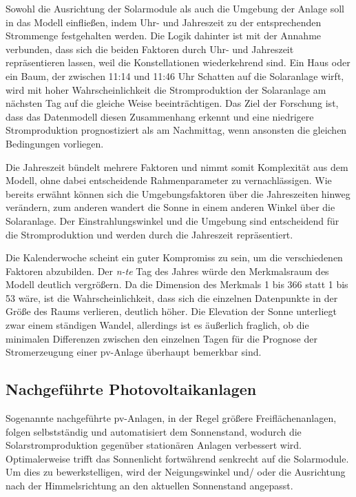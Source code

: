 \documentclass[12pt, a4paper]{article}
\begin{document}
Sowohl die Ausrichtung der Solarmodule als auch die Umgebung der Anlage soll in das Modell einfließen, indem Uhr- und Jahreszeit zu der entsprechenden Strommenge festgehalten werden. Die Logik dahinter ist mit der Annahme verbunden, dass sich die beiden Faktoren durch Uhr- und Jahreszeit repräsentieren lassen, weil die Konstellationen wiederkehrend sind. Ein Haus oder ein Baum, der zwischen 11:14 und 11:46 Uhr Schatten auf die Solaranlage wirft, wird mit hoher Wahrscheinlichkeit die Stromproduktion der Solaranlage am nächsten Tag auf die gleiche Weise beeinträchtigen. Das Ziel der Forschung ist, dass das Datenmodell diesen Zusammenhang erkennt und eine niedrigere Stromproduktion prognostiziert als am Nachmittag, wenn ansonsten die gleichen Bedingungen vorliegen.

Die Jahreszeit bündelt mehrere Faktoren und nimmt somit Komplexität aus dem Modell, ohne dabei entscheidende Rahmenparameter zu vernachlässigen. Wie bereits erwähnt können sich die Umgebungsfaktoren über die Jahreszeiten hinweg verändern, zum anderen wandert die Sonne in einem anderen Winkel über die Solaranlage. Der Einstrahlungswinkel und die Umgebung sind entscheidend für die Stromproduktion und werden durch die Jahreszeit repräsentiert.

 Die Kalenderwoche scheint ein guter Kompromiss zu sein, um die verschiedenen Faktoren abzubilden. Der \textit{n-te} Tag des Jahres würde den Merkmalsraum des Modell deutlich vergrößern. Da die Dimension des Merkmals 1 bis 366 statt 1 bis 53 wäre, ist die Wahrscheinlichkeit, dass sich die einzelnen Datenpunkte in der Größe des Raums verlieren, deutlich höher. Die Elevation der Sonne unterliegt zwar einem ständigen Wandel, allerdings ist es äußerlich fraglich, ob die minimalen Differenzen zwischen den einzelnen Tagen für die Prognose der Stromerzeugung einer \ac{pv}-Anlage überhaupt bemerkbar sind.

 

\subsection{Nachgeführte Photovoltaikanlagen}
\label{subsec:tracked_systems}

Sogenannte nachgeführte \ac{pv}-Anlagen, in der Regel größere Freiflächenanlagen, folgen selbstständig und automatisiert dem Sonnenstand, wodurch die Solarstromproduktion gegenüber stationären Anlagen verbessert wird. Optimalerweise trifft das Sonnenlicht fortwährend senkrecht auf die Solarmodule. Um dies zu bewerkstelligen, wird der Neigungswinkel und/ oder die Ausrichtung nach der Himmelsrichtung an den aktuellen Sonnenstand angepasst. 
\end{document}
